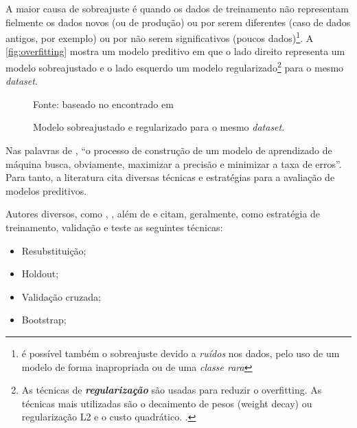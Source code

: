 A maior causa de sobreajuste é quando os dados de treinamento não representam fielmente os dados novos (ou de produção) ou por serem diferentes (caso de dados antigos, por exemplo) ou por não serem significativos (poucos dados)\footnote{ é possível também o sobreajuste devido a \textit{ruídos} nos dados, pelo uso de um modelo de forma inapropriada ou de uma \textit{classe rara} }. A \autoref{fig:overfitting} mostra um modelo preditivo em que o lado direito representa um modelo sobreajustado e o lado esquerdo um modelo regularizado\footnote{As técnicas de \textbf{\textit{regularização}} são usadas para reduzir o overfitting. As técnicas mais utilizadas são o decaimento de pesos (weight decay) ou regularização L2 e o custo quadrático. \cite{deep_learning_book_2019}.} para o mesmo \textit{dataset}.

\begin{figure}[h!]
	\centering
	\caption{Modelo sobreajustado e regularizado para o mesmo \textit{dataset}.}
	
	{\scriptsize Fonte: baseado no encontrado em }
	\label{fig:overfitting}
\end{figure}

Nas palavras de , ``o processo de construção de um modelo de aprendizado de máquina busca, obviamente, maximizar a precisão e minimizar a taxa de erros''. Para tanto, a literatura cita diversas técnicas e estratégias para a avaliação de modelos preditivos. 

Autores diversos, como , , além de   e  citam, geralmente, como estratégia de treinamento, validação e teste as seguintes técnicas:
\begin{itemize}
	\item Resubstituição;
	\item Holdout;
	\item Validação cruzada;
	\item Bootstrap;
\end{itemize}

